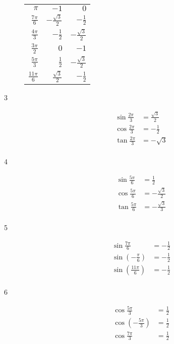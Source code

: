 \documentclass{exam}
\begin{document}
\begin{description}
\begin{tabular}[H]{rrr}
          \midrule
          $\pi$             & $-1$                  & $0$ \\
          $\frac{7 \pi}{6}$ & $-\frac{\sqrt{3}}{2}$ & $-\frac{1}{2}$ \\
          $\frac{4 \pi}{3}$ & $-\frac{1}{2}$        & $-\frac{\sqrt{3}}{2}$   \\

          \midrule
          $\frac{3 \pi}{2}$  & $0$                  & $-1$ \\
          $\frac{5\pi}{3}$   & $\frac{1}{2}$        & $-\frac{\sqrt{3}}{2}$   \\
          $\frac{11 \pi}{6}$ & $\frac{\sqrt{3}}{2}$ & $-\frac{1}{2}$ \\

          \bottomrule
        \end{tabular}

      \item[3]
        \begin{align*}
          \sin \frac{2 \pi}{3} &= \frac{\sqrt{3}}{2} \\
          \cos \frac{2 \pi}{3} &= - \frac{1}{2} \\
          \tan \frac{2 \pi}{3} &= - \sqrt{3} \\
        \end{align*}

      \item[4]
        \begin{align*}
          \sin \frac{5 \pi}{6} &= \frac{1}{2} \\
          \cos \frac{5 \pi}{6} &= - \frac{\sqrt{3}}{2} \\
          \tan \frac{5 \pi}{6} &= - \frac{\sqrt{3}}{3} \\
        \end{align*}

      \item[5]
        \begin{align*}
          \sin \frac{7 \pi}{6}                 &= - \frac{1}{2} \\
          \sin \left( - \frac{\pi}{6} \right)  &= - \frac{1}{2} \\
          \sin \left( \frac{11 \pi}{6} \right) &= - \frac{1}{2} \\
        \end{align*}

      \item[6]
        \begin{align*}
          \cos \frac{5 \pi}{3}                  &= \frac{1}{2} \\
          \cos \left( - \frac{5 \pi}{3} \right) &= \frac{1}{2} \\
          \cos \frac{7 \pi}{3}                  &= \frac{1}{2} \\
        \end{align*}


\end{description}
\end{document}
